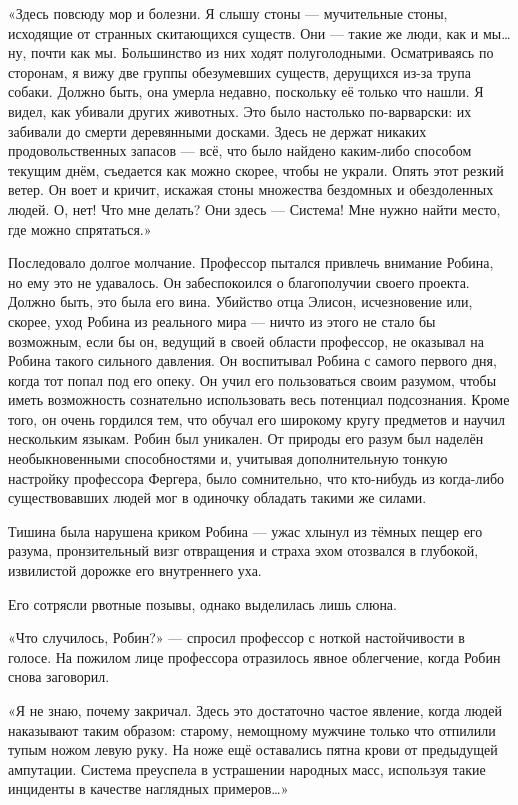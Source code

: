 \documentclass[a5paper, 9pt,
final, openany, twoside=true]{memoir}
\begin{document}
«Здесь повсюду мор и болезни. Я слышу стоны — мучительные стоны, исходящие от странных скитающихся существ. Они — такие же люди, как и мы… ну, почти как мы. Большинство из них ходят полуголодными. Осматриваясь по сторонам, я вижу две группы обезумевших существ, дерущихся из-за трупа собаки. Должно быть, она умерла недавно, поскольку её только что нашли. Я видел, как убивали других животных. Это было настолько по-варварски: их забивали до смерти деревянными досками. Здесь не держат никаких продовольственных запасов — всё, что было найдено каким-либо способом текущим днём, съедается как можно скорее, чтобы не украли. Опять этот резкий ветер. Он воет и кричит, искажая стоны множества бездомных и обездоленных людей. О, нет! Что мне делать? Они здесь — Система! Мне нужно найти место, где можно спрятаться.»\bigskip

Последовало долгое молчание. Профессор пытался привлечь внимание Робина, но ему это не удавалось. Он забеспокоился о благополучии своего проекта. Должно быть, это была его вина. Убийство отца Элисон, исчезновение или, скорее, уход Робина из реального мира — ничто из этого не стало бы возможным, если бы он, ведущий в своей области профессор, не оказывал на Робина такого сильного давления. Он воспитывал Робина с самого первого дня, когда тот попал под его опеку. Он учил его пользоваться своим разумом, чтобы иметь возможность сознательно использовать весь потенциал подсознания. Кроме того, он очень гордился тем, что обучал его широкому кругу предметов и научил нескольким языкам. Робин был уникален. От природы его разум был наделён необыкновенными способностями и, учитывая дополнительную тонкую настройку профессора Фергера, было сомнительно, что кто-нибудь из когда-либо существовавших людей мог в одиночку обладать такими же силами.\bigskip

Тишина была нарушена криком Робина — ужас хлынул из тёмных пещер его разума, пронзительный визг отвращения и страха эхом отозвался в глубокой, извилистой дорожке его внутреннего уха.

Его сотрясли рвотные позывы, однако выделилась лишь слюна.

«Что случилось, Робин?» — спросил профессор с ноткой настойчивости в голосе. На пожилом лице профессора отразилось явное облегчение, когда Робин снова заговорил.

«Я не знаю, почему закричал. Здесь это достаточно частое явление, когда людей наказывают таким образом: старому, немощному мужчине только что отпилили тупым ножом левую руку. На ноже ещё оставались пятна крови от предыдущей ампутации. Система преуспела в устрашении народных масс, используя такие инциденты в качестве наглядных примеров…»
\end{document}
